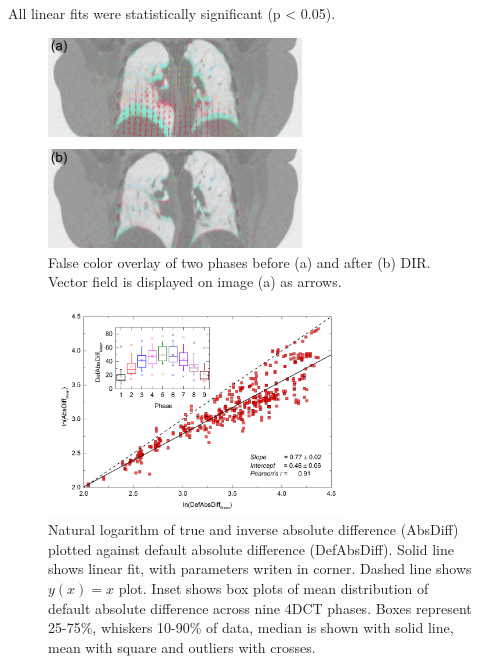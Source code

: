 \documentclass[type=dr, dr=rernat, accentcolor=tud7b,colorbacktitle, bigchapter, openright, twoside, 12pt ]{tudthesis}
\begin{document}
All linear fits were statistically significant (p < 0.05).

\begin{figure}[H]
	\begin{center}		
		\includegraphics[width=0.6\textwidth]{./Images/exampleReg.png}
		\caption{False color overlay of two phases before (a) and after (b) DIR. Vector field is displayed on image (a) as arrows.}
		\label{exampleReg_lung}
	\end{center}
\end{figure}



\begin{figure}[H]
	\begin{center}		
		\includegraphics[width=0.7\textwidth]{./Images/absDiff.png}
		\caption{Natural logarithm of true and inverse absolute difference (AbsDiff) plotted against default absolute difference (DefAbsDiff). Solid line shows linear fit, with parameters
		writen in corner. Dashed line shows $y(x)=x$ plot. Inset shows box plots of mean distribution of default absolute difference across nine 4DCT phases. Boxes represent 25-75\%, whiskers 10-90\%
		of data, median is shown with solid line, mean with square and outliers with crosses.}
		\label{absDiff_lung}
	\end{center}
\end{figure}
\end{document}
